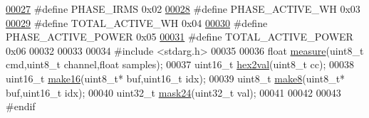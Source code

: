 \begin{DoxyCode}
\hypertarget{a00043_source_l00027}{}\hyperlink{a00043_a15c9ccf287820001431c33c4bb25a23b}{00027} \textcolor{preprocessor}{}\textcolor{preprocessor}{#define PHASE\_IRMS          0x02}
\hypertarget{a00043_source_l00028}{}\hyperlink{a00043_a4ee773ad07fa969b9990f9bb3a1a2093}{00028} \textcolor{preprocessor}{}\textcolor{preprocessor}{#define PHASE\_ACTIVE\_WH     0x03}
\hypertarget{a00043_source_l00029}{}\hyperlink{a00043_ad8d2fc353ef124a8144e6d8264e43d1a}{00029} \textcolor{preprocessor}{}\textcolor{preprocessor}{#define TOTAL\_ACTIVE\_WH     0x04}
\hypertarget{a00043_source_l00030}{}\hyperlink{a00043_abd3f95c7cd63d0627552d293bf49e026}{00030} \textcolor{preprocessor}{}\textcolor{preprocessor}{#define PHASE\_ACTIVE\_POWER  0x05}
\hypertarget{a00043_source_l00031}{}\hyperlink{a00043_a7d0d4057be5aaf168a22ee4379e6ff30}{00031} \textcolor{preprocessor}{}\textcolor{preprocessor}{#define TOTAL\_ACTIVE\_POWER  0x06}
00032 \textcolor{preprocessor}{}
00033 
00034 \textcolor{preprocessor}{#include <stdarg.h>} 
00035 
00036 \textcolor{keywordtype}{float}       \hyperlink{a00009_gac914ebaa64afce03ee852af09659cf69}{measure}(uint8\_t cmd,uint8\_t channel,\textcolor{keywordtype}{float} samples);
00037 uint16\_t    \hyperlink{a00009_gab120dc4bec6b4097a5cd3ebb91131c57}{hex2val}(uint8\_t cc);
00038 uint16\_t    \hyperlink{a00009_ga1e74920f34a07a82cca58eab71ed12b3}{make16}(uint8\_t* buf,uint16\_t idx);
00039 uint8\_t     \hyperlink{a00009_gaefa26c3e5b22ccbe5de1c33305f20e1b}{make8}(uint8\_t* buf,uint16\_t idx);
00040 uint32\_t    \hyperlink{a00043_a983d38050e934f77d4eb3fc73658d985}{mask24}(uint32\_t val);
00041   
00042 
00043 \textcolor{preprocessor}{#endif}
\end{DoxyCode}
